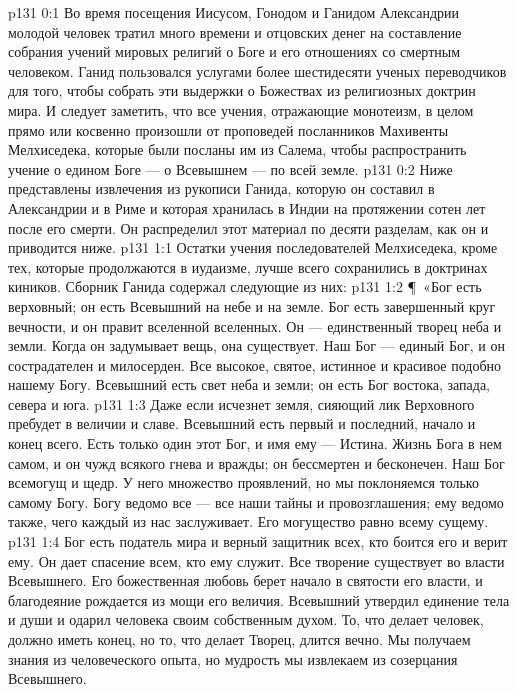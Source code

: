 \vs p131 0:1 Во время посещения Иисусом, Гонодом и Ганидом Александрии молодой человек тратил много времени и отцовских денег на составление собрания учений мировых религий о Боге и его отношениях со смертным человеком. Ганид пользовался услугами более шестидесяти ученых переводчиков для того, чтобы собрать эти выдержки о Божествах из религиозных доктрин мира. И следует заметить, что все учения, отражающие монотеизм, в целом прямо или косвенно произошли от проповедей посланников Махивенты Мелхиседека, которые были посланы им из Салема, чтобы распространить учение о едином Боге --- о Всевышнем --- по всей земле.
\vs p131 0:2 Ниже представлены извлечения из рукописи Ганида, которую он составил в Александрии и в Риме и которая хранилась в Индии на протяжении сотен лет после его смерти. Он распределил этот материал по десяти разделам, как он и приводится ниже.
\vs p131 1:1 Остатки учения последователей Мелхиседека, кроме тех, которые продолжаются в иудаизме, лучше всего сохранились в доктринах киников. Сборник Ганида содержал следующие из них:
\vs p131 1:2 \P\ «Бог есть верховный; он есть Всевышний на небе и на земле. Бог есть завершенный круг вечности, и он правит вселенной вселенных. Он --- единственный творец неба и земли. Когда он задумывает вещь, она существует. Наш Бог --- единый Бог, и он сострадателен и милосерден. Все высокое, святое, истинное и красивое подобно нашему Богу. Всевышний есть свет неба и земли; он есть Бог востока, запада, севера и юга.
\vs p131 1:3 Даже если исчезнет земля, сияющий лик Верховного пребудет в величии и славе. Всевышний есть первый и последний, начало и конец всего. Есть только один этот Бог, и имя ему --- Истина. Жизнь Бога в нем самом, и он чужд всякого гнева и вражды; он бессмертен и бесконечен. Наш Бог всемогущ и щедр. У него множество проявлений, но мы поклоняемся только самому Богу. Богу ведомо все --- все наши тайны и провозглашения; ему ведомо также, чего каждый из нас заслуживает. Его могущество равно всему сущему.
\vs p131 1:4 Бог есть податель мира и верный защитник всех, кто боится его и верит ему. Он дает спасение всем, кто ему служит. Все творение существует во власти Всевышнего. Его божественная любовь берет начало в святости его власти, и благодеяние рождается из мощи его величия. Всевышний утвердил единение тела и души и одарил человека своим собственным духом. То, что делает человек, должно иметь конец, но то, что делает Творец, длится вечно. Мы получаем знания из человеческого опыта, но мудрость мы извлекаем из созерцания Всевышнего.
